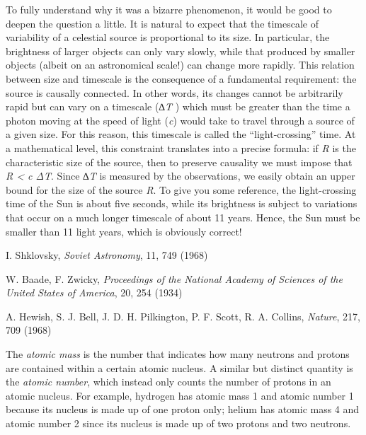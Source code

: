 \begin{description}[style=multiline,leftmargin=2em,labelwidth=1.5em]
\item[4.]\hypertarget{note:05-04}{}To fully understand why it was a bizarre phenomenon, it would be good to deepen the
question a little. It is natural to expect that the timescale of
variability of a celestial source is proportional to its size. In
particular, the brightness of larger objects can only vary slowly, while that produced
by smaller objects (albeit on an astronomical scale!) can change more rapidly. This
relation between size and timescale is the consequence of a fundamental requirement: the
source is causally connected. In other words, its changes cannot be arbitrarily rapid
but can vary on a timescale (\emph{∆T} ) which must be greater than the time a photon
moving at the speed of light (\emph{c}) would take to travel through a source of a given
size. For this reason, this timescale is called the ``light-crossing'' time. At a
mathematical level, this constraint translates into a precise formula: if \emph{R} is
the characteristic size of the source, then to preserve causality we must impose that
\emph{R \textless{} c ΔT}. Since \emph{∆T} is measured by the observations, we easily
obtain an upper bound for the size of the source \emph{R}. To give you some reference,
the light-crossing time of the Sun is about five seconds, while its brightness is
subject to variations that occur on a much longer timescale of about 11 years. Hence,
the Sun must be smaller than 11 light years, which is obviously correct!

\item[5.]\hypertarget{note:05-05}{}I. Shklovsky, \emph{Soviet Astronomy}, 11, 749 (1968)

\item[6.]\hypertarget{note:05-06}{}W. Baade, F. Zwicky, \emph{Proceedings of the National Academy of Sciences of the
United States of America}, 20, 254 (1934)

\item[7.]\hypertarget{note:05-07}{}A. Hewish, S. J. Bell, J. D. H. Pilkington, P. F. Scott, R. A.
Collins, \emph{Nature}, 217, 709 (1968)

\item[8.]\hypertarget{note:05-08}{}The \emph{atomic mass} is the number that indicates how many neutrons and protons are
contained within a certain atomic nucleus. A similar but distinct quantity is the
\emph{atomic number}, which instead only counts the number of protons in an atomic
nucleus. For example, hydrogen has atomic mass 1 and atomic number 1 because its nucleus
is made up of one proton only; helium has atomic mass 4 and atomic number 2 since its
nucleus is made up of two protons and two neutrons.


\end{description}
